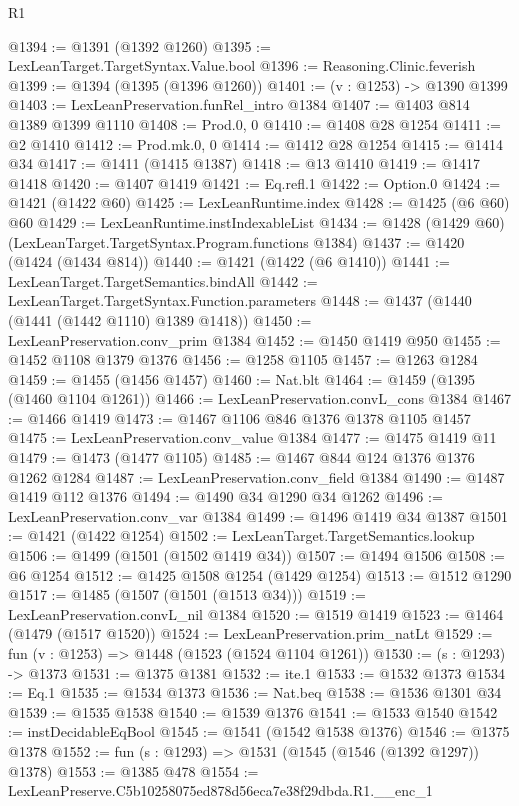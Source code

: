 \begin{lexlean}{R1}
\begin{coremodule}
@1394 := @1391 (@1392 @1260)
@1395 := LexLeanTarget.TargetSyntax.Value.bool
@1396 := Reasoning.Clinic.feverish
@1399 := @1394 (@1395 (@1396 @1260))
@1401 := (v : @1253) -> @1390 @1399
@1403 := LexLeanPreservation.funRel_intro @1384
@1407 := @1403 @814 @1389 @1399 @1110
@1408 := Prod.{0, 0}
@1410 := @1408 @28 @1254
@1411 := @2 @1410
@1412 := Prod.mk.{0, 0}
@1414 := @1412 @28 @1254
@1415 := @1414 @34
@1417 := @1411 (@1415 @1387)
@1418 := @13 @1410
@1419 := @1417 @1418
@1420 := @1407 @1419
@1421 := Eq.refl.{1}
@1422 := Option.{0}
@1424 := @1421 (@1422 @60)
@1425 := LexLeanRuntime.index
@1428 := @1425 (@6 @60) @60
@1429 := LexLeanRuntime.instIndexableList
@1434 := @1428 (@1429 @60) (LexLeanTarget.TargetSyntax.Program.functions @1384)
@1437 := @1420 (@1424 (@1434 @814))
@1440 := @1421 (@1422 (@6 @1410))
@1441 := LexLeanTarget.TargetSemantics.bindAll
@1442 := LexLeanTarget.TargetSyntax.Function.parameters
@1448 := @1437 (@1440 (@1441 (@1442 @1110) @1389 @1418))
@1450 := LexLeanPreservation.conv_prim @1384
@1452 := @1450 @1419 @950
@1455 := @1452 @1108 @1379 @1376
@1456 := @1258 @1105
@1457 := @1263 @1284
@1459 := @1455 (@1456 @1457)
@1460 := Nat.blt
@1464 := @1459 (@1395 (@1460 @1104 @1261))
@1466 := LexLeanPreservation.convL_cons @1384
@1467 := @1466 @1419
@1473 := @1467 @1106 @846 @1376 @1378 @1105 @1457
@1475 := LexLeanPreservation.conv_value @1384
@1477 := @1475 @1419 @11
@1479 := @1473 (@1477 @1105)
@1485 := @1467 @844 @124 @1376 @1376 @1262 @1284
@1487 := LexLeanPreservation.conv_field @1384
@1490 := @1487 @1419 @112 @1376
@1494 := @1490 @34 @1290 @34 @1262
@1496 := LexLeanPreservation.conv_var @1384
@1499 := @1496 @1419 @34 @1387
@1501 := @1421 (@1422 @1254)
@1502 := LexLeanTarget.TargetSemantics.lookup
@1506 := @1499 (@1501 (@1502 @1419 @34))
@1507 := @1494 @1506
@1508 := @6 @1254
@1512 := @1425 @1508 @1254 (@1429 @1254)
@1513 := @1512 @1290
@1517 := @1485 (@1507 (@1501 (@1513 @34)))
@1519 := LexLeanPreservation.convL_nil @1384
@1520 := @1519 @1419
@1523 := @1464 (@1479 (@1517 @1520))
@1524 := LexLeanPreservation.prim_natLt
@1529 := fun (v : @1253) => @1448 (@1523 (@1524 @1104 @1261))
@1530 := (s : @1293) -> @1373
@1531 := @1375 @1381
@1532 := ite.{1}
@1533 := @1532 @1373
@1534 := Eq.{1}
@1535 := @1534 @1373
@1536 := Nat.beq
@1538 := @1536 @1301 @34
@1539 := @1535 @1538
@1540 := @1539 @1376
@1541 := @1533 @1540
@1542 := instDecidableEqBool
@1545 := @1541 (@1542 @1538 @1376)
@1546 := @1375 @1378
@1552 := fun (s : @1293) => @1531 (@1545 (@1546 (@1392 @1297)) @1378)
@1553 := @1385 @478
@1554 := LexLeanPreserve.C5b10258075ed878d56eca7e38f29dbda.R1.__enc_1

\end{coremodule}
\end{lexlean}
